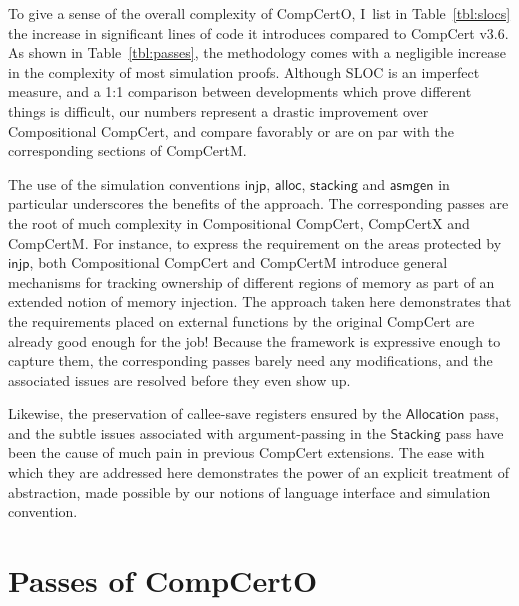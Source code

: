 \documentclass[11pt,oneside]{book}
\theoremstyle{definition}
\newcommand{\kw}[1]{\ensuremath{ \mathsf{#1} }}
\begin{document}
To give a sense of the overall complexity of CompCertO,
I~list in Table~\ref{tbl:slocs}
the increase in significant lines of code it introduces
compared to CompCert v$3.6$.
As shown in Table~\ref{tbl:passes},
the methodology comes with a negligible increase
in the complexity of most simulation proofs.
Although SLOC is an imperfect measure,
and a 1:1 comparison between developments which
prove different things is difficult,
our numbers represent
a drastic improvement over Compositional CompCert,
and compare favorably
or are on par with
the corresponding sections of CompCertM.

The use of the simulation conventions
\kw{injp}, \kw{alloc}, \kw{stacking} and \kw{asmgen}
in particular
underscores the benefits of the approach.
The corresponding passes are the root of
much complexity
in Compositional CompCert, CompCertX and CompCertM.
For instance,
to express the requirement on
the areas protected by \kw{injp},
both Compositional CompCert and CompCertM
introduce general mechanisms for tracking ownership of
different regions of memory
as part of an extended notion of memory injection.
The approach taken here demonstrates that
the requirements placed on external functions
by the original CompCert
are already good enough for the job!
Because the framework is expressive enough to capture them,
the corresponding passes barely need any modifications,
and the associated issues are resolved before they even show up.

Likewise, the preservation of callee-save registers
ensured by the \kw{Allocation} pass,
and the subtle issues associated with argument-passing
in the \kw{Stacking} pass
have been the cause of much pain
in previous CompCert extensions.
The ease with which they are addressed here
demonstrates the power of
an explicit treatment of abstraction,
made possible
by our notions of language interface and simulation convention.



\chapter{Passes of CompCertO} %
\end{document}
